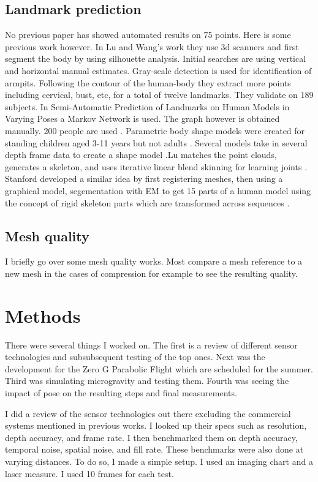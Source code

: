 \section{Landmark prediction}
No previous paper has showed automated results on 75 points. Here is some previous work however. In Lu and Wang's work \cite{lu2008automated} they use 3d scanners and first segment the body by using silhouette analysis. Initial searches are using vertical and horizontal manual estimates. Gray-scale detection is used for identification of armpits. Following the contour of the human-body they extract more points including cervical, bust, etc, for a total of twelve landmarks. They validate on 189 subjects. In Semi-Automatic Prediction of Landmarks on Human Models in Varying Poses a Markov Network is used. The graph however is obtained manually. 200 people are used \cite{wuhrer2010semi}. Parametric body shape models were created for standing children aged 3-11 years but not adults \cite{park2015parametric}. Several models take in several depth frame data to create a shape model \cite{deng2019neural}.Lu matches the point clouds, generates a skeleton, and uses iterative linear blend skinning for learning joints \cite{lu20193d}. Stanford developed a similar idea by first registering meshes, then using a graphical model, segementation with EM to get 15 parts of a human model using the concept of rigid skeleton parts which are transformed across sequences \cite{anguelov2012recovering}.

\section{Mesh quality}
I briefly go over some mesh quality works. Most compare a mesh reference to a new mesh in the cases of compression for example to see the resulting quality.

\chapter{Methods}
There were several things I worked on. The first is a review of different sensor technologies and subsubsequent testing of the top ones. Next was the development for the Zero G Parabolic Flight which are scheduled for the summer. Third was simulating microgravity and testing them. Fourth was seeing the impact of pose on the resulting steps and final measurements.

I did a review of the sensor technologies out there excluding the commercial systems mentioned in previous works. I looked up their specs such as resolution, depth accuracy, and frame rate. I then benchmarked them on depth accuracy, temporal noise, spatial noise, and fill rate. These benchmarks were also done at varying distances. To do so, I made a simple setup. I used an imaging chart and a laser measure. I used 10 frames for each test.

